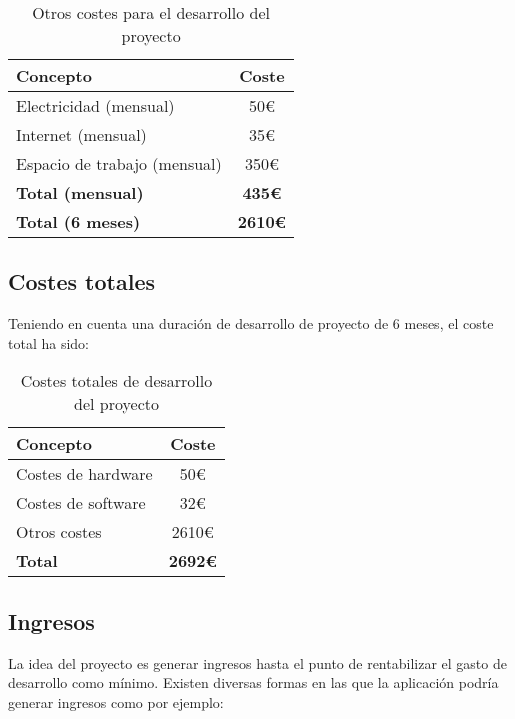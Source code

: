 \begin{table}[h]
\centering
\begin{tabular}{|l|c|}
\hline
\textbf{Concepto} & \textbf{Coste} \\
\hline
Electricidad (mensual) & 50€ \\
Internet (mensual) & 35€ \\
Espacio de trabajo (mensual) & 350€ \\
\hline
\textbf{Total (mensual)} & \textbf{435€} \\
\hline
\textbf{Total (6 meses)} & \textbf{2610€} \\
\hline
\end{tabular}
\caption{Otros costes para el desarrollo del proyecto}
\end{table}

\subsection{Costes totales}
Teniendo en cuenta una duración de desarrollo de proyecto de 6 meses, el coste total ha sido:

\begin{table}[h]
\centering
\begin{tabular}{|l|c|}
\hline
\textbf{Concepto} & \textbf{Coste} \\
\hline
Costes de hardware & 50€ \\
Costes de software & 32€ \\
Otros costes & 2610€ \\
\hline
\textbf{Total} & \textbf{2692€} \\
\hline
\end{tabular}
\caption{Costes totales de desarrollo del proyecto}
\end{table}

\subsection{Ingresos}
La idea del proyecto es generar ingresos hasta el punto de rentabilizar el gasto de desarrollo como mínimo. 
Existen diversas formas en las que la aplicación podría generar ingresos como por ejemplo:

